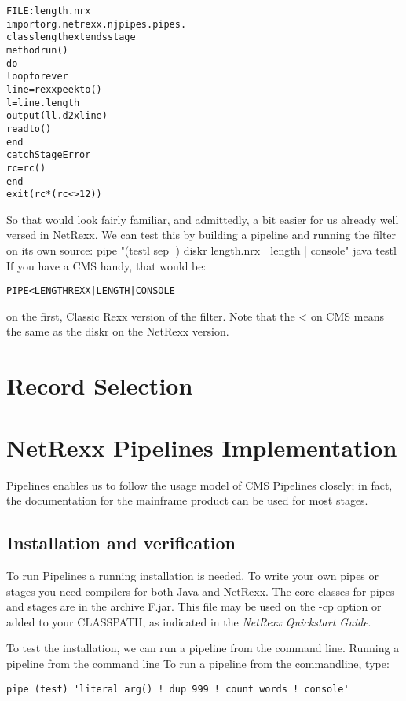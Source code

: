 \begin{alltt}
FILE: length.nrx
import org.netrexx.njpipes.pipes.
class length extends stage
method run()
  do
    loop forever
      line = rexx peekto()
      l = line.length
      output(l l.d2x line)
      readto()
    end
  catch StageError
    rc = rc()
  end
  exit(rc*(rc<>12))
 \end{alltt}
So that would look fairly familiar, and admittedly, a bit easier for us already well versed in NetRexx.
We can test this by building a pipeline and running the filter on its own source:
pipe "(testl sep |) diskr length.nrx | length | console"
java testl
If you have a CMS handy, that would be:
\begin{alltt}
  PIPE < LENGTH REXX | LENGTH | CONSOLE
 \end{alltt}
on the first, Classic Rexx version of the filter. Note that the < on CMS means the same as the diskr on the NetRexx version.


\chapter{Record Selection}


\chapter{NetRexx Pipelines Implementation}
\nr{} Pipelines enables us to follow the usage model of CMS Pipelines
closely; in fact, the documentation for the mainframe product can be
used for most stages.

\section{Installation and verification}
To run \nr{} Pipelines a running \nr{} installation is needed.  To write your own pipes or stages you need compilers for both Java and NetRexx. 
The core classes for pipes and stages are in the archive \nr{}F.jar.  This file may
be used on the -cp option or added to your CLASSPATH, as indicated in
the \emph{NetRexx Quickstart Guide}.

To test the installation, we can run a pipeline from the command line.
Running a pipeline from the command line
 To run a pipeline from the commandline, type:
\begin{lstlisting}[label=countwords,caption=Count Words]
pipe (test) 'literal arg() ! dup 999 ! count words ! console'
\end{lstlisting}

